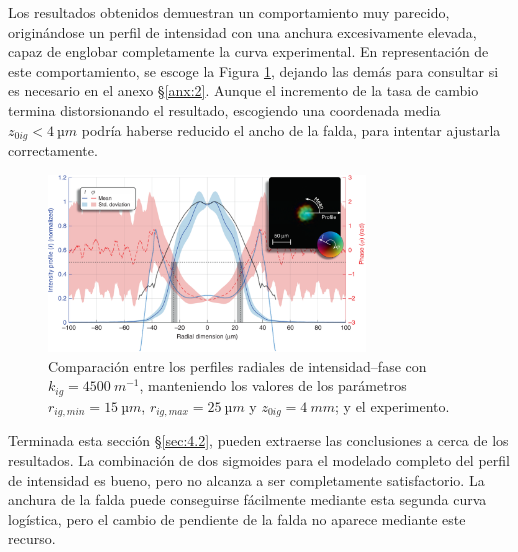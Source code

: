 Los resultados obtenidos demuestran un comportamiento muy parecido, originándose un perfil de intensidad con una anchura excesivamente elevada, capaz de englobar completamente la curva experimental. En representación de este comportamiento, se escoge la Figura \ref{fig:4.26}, dejando las demás para consultar si es necesario en el anexo \S\ref{anx:2}. Aunque el incremento de la tasa de cambio termina distorsionando el resultado, escogiendo una coordenada media $z_{0ig}<\qty{4}{µm}$ podría haberse reducido el ancho de la falda, para intentar ajustarla correctamente.

\begin{figure}[htbp]
  \centering
  \includegraphics[width=0.75\textwidth]{Figuras/ch4_cmp61.png}
  \caption{Comparación entre los perfiles radiales de intensidad--fase con $k_{ig}=\qty{4500}{m^{-1}}$, manteniendo los valores de los parámetros $r_{ig,min}=\qty{15}{µm}$, $r_{ig,max}=\qty{25}{µm}$ y $z_{0ig}=\qty{4}{mm}$; y el experimento.}
  \label{fig:4.26}
\end{figure}

Terminada esta sección \S\ref{sec:4.2}, pueden extraerse las conclusiones a cerca de los resultados. La combinación de dos sigmoides para el modelado completo del perfil de intensidad es bueno, pero no alcanza a ser completamente satisfactorio. La anchura de la falda puede conseguirse fácilmente mediante esta segunda curva logística, pero el cambio de pendiente de la falda no aparece mediante este recurso. 

